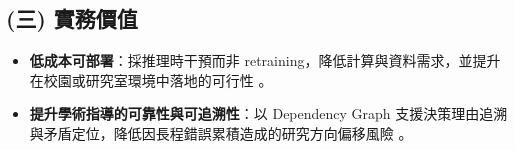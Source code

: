 \subsection*{(三) 實務價值}
\begin{itemize}
  \item \textbf{低成本可部署}：採推理時干預而非 retraining，降低計算與資料需求，並提升在校園或研究室環境中落地的可行性 \citep{turner-etal-2023-activation-addition,wehner-etal-2025-representation-engineering}。
  \item \textbf{提升學術指導的可靠性與可追溯性}：以 Dependency Graph 支援決策理由追溯與矛盾定位，降低因長程錯誤累積造成的研究方向偏移風險 \citep{a2602_05665v1_graphagentmemory,liu2025agendaaware_meetingsum}。
\end{itemize}